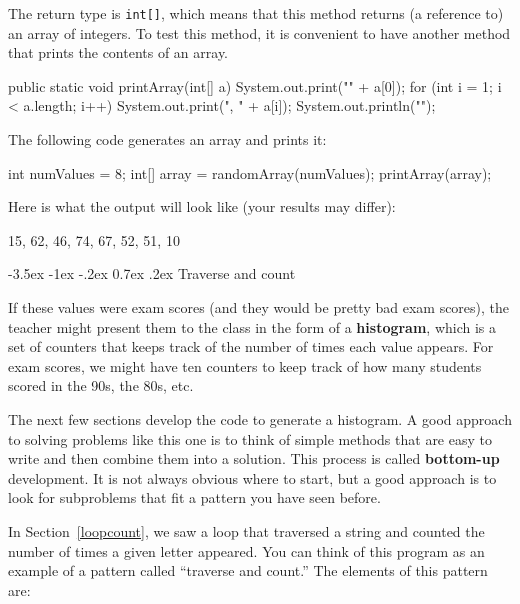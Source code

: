 \documentclass[12pt]{book}
\makeatletter
\theoremstyle{exercise}
\newcommand{\java}[1]{\verb"#1"}
\renewcommand{\section}{\@startsection {section}{1}{\z@}%
    {-3.5ex \@plus -1ex \@minus -.2ex}%
    {0.7ex \@plus.2ex}%
    {\normalfont\Large\bfseries}}
\newcommand{\java}[1]{\lstinline{#1}} %
\makeatother
\begin{document}
The return type is \java{int[]}, which means that this method returns (a reference to) an array of integers.
To test this method, it is convenient to have another method that prints the contents of an array.

\begin{code}
    public static void printArray(int[] a) {
        System.out.print("{" + a[0]);
        for (int i = 1; i < a.length; i++) {
            System.out.print(", " + a[i]);
        }
        System.out.println("}");
    }
\end{code}

The following code generates an array and prints it:

\begin{code}
    int numValues = 8;
    int[] array = randomArray(numValues);
    printArray(array);
\end{code}

Here is what the output will look like (your results may differ):

\begin{stdout}
{15, 62, 46, 74, 67, 52, 51, 10}
\end{stdout}


\section{Traverse and count}


If these values were exam scores (and they would be pretty bad exam scores), the teacher might present them to the class in the form of a {\bf histogram}, which is a set of counters that keeps track of the number of times each value appears.
For exam scores, we might have ten counters to keep track of how many students scored in the 90s, the 80s, etc.


The next few sections develop the code to generate a histogram.
A good approach to solving problems like this one is to think of simple methods that are easy to write and then combine them into a solution.
This process is called {\bf bottom-up} development.
It is not always obvious where to start, but a good approach is to look for subproblems that fit a pattern you have seen before.


In Section~\ref{loopcount}, we saw a loop that traversed a string and counted the number of times a given letter appeared.
You can think of this program as an example of a pattern called ``traverse and count.''
The elements of this pattern are:
\end{document}
